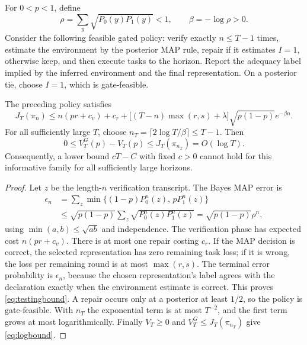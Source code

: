 For $0<p<1$, define
\begin{equation}
\rho=\sum_y\sqrt{P_0(y)P_1(y)}<1,\qquad \beta=-\log\rho>0.
\end{equation}
Consider the following feasible gated policy: verify exactly $n\le T-1$ times,
estimate the environment by the posterior MAP rule, repair if it estimates
$I=1$, otherwise keep, and then execute tasks to the horizon. Report the
adequacy label implied by the inferred environment and the final representation.
On a posterior tie, choose $I=1$, which is gate-feasible.

\begin{theorem}
\label{thm:log}
The preceding policy satisfies
\begin{equation}
J_T(\pi_n)\le
n(pr+c_v)+c_r+
\bigl[(T-n)\max(r,s)+\lambda\bigr]\sqrt{p(1-p)}e^{-\beta n}.
\label{eq:testingbound}
\end{equation}
For all sufficiently large $T$, choose
$n_T=\lceil2\log T/\beta\rceil\le T-1$. Then
\begin{equation}
0\le V_T^G(p)-V_T(p)\le J_T(\pi_{n_T})=O(\log T).
\label{eq:logbound}
\end{equation}
Consequently, a lower bound $cT-C$ with fixed $c>0$ cannot hold for this
informative family for all sufficiently large horizons.
\end{theorem}
\begin{proof}
Let $z$ be the length-$n$ verification transcript. The Bayes MAP error is
\begin{align*}
\epsilon_n&=\sum_z\min\{(1-p)P_0^n(z),\,pP_1^n(z)\}\\
&\le \sqrt{p(1-p)}\sum_z\sqrt{P_0^n(z)P_1^n(z)}
=\sqrt{p(1-p)}\rho^n,
\end{align*}
using $\min(a,b)\le\sqrt{ab}$ and independence.
The verification phase has expected cost $n(pr+c_v)$. There is at most one
repair costing $c_r$. If the MAP decision is correct, the selected
representation has zero remaining task loss; if it is wrong, the loss per
remaining round is at most $\max(r,s)$. The terminal error probability is
$\epsilon_n$, because the chosen representation's label agrees with the
declaration exactly when the environment estimate is correct. This proves
\eqref{eq:testingbound}. A repair occurs only at a posterior at least $1/2$, so
the policy is gate-feasible. With $n_T$ the exponential term is at most $T^{-2}$,
and the first term grows at most logarithmically. Finally $V_T\ge0$ and
$V_T^G\le J_T(\pi_{n_T})$ give \eqref{eq:logbound}.
\end{proof}

